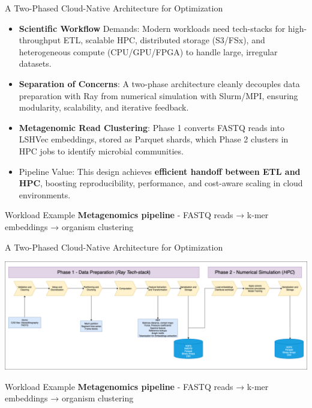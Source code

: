 \documentclass[aspectratio=169]{beamer}
\begin{document}
\begin{frame}{A Two-Phased Cloud-Native Architecture for Optimization}
    \begin{itemize}


\item \textbf{Scientific Workflow} Demands: Modern workloads need tech-stacks for high-throughput ETL, scalable HPC, distributed storage (S3/FSx), and heterogeneous compute (CPU/GPU/FPGA) to handle large, irregular datasets.

\item \textbf{Separation of Concerns}: A two-phase architecture cleanly decouples data preparation with Ray from numerical simulation with Slurm/MPI, ensuring modularity, scalability, and iterative feedback.

\item \textbf{Metagenomic Read Clustering}: Phase 1 converts FASTQ reads into LSHVec embeddings, stored as Parquet shards, which Phase 2 clusters in HPC jobs to identify microbial communities.

\item Pipeline Value: This design achieves \textbf{efficient handoff between ETL and HPC}, boosting reproducibility, performance, and cost-aware scaling in cloud environments.
        
    \end{itemize}
        
    \vspace{0.3cm}
    \begin{block}{Workload Example}
        \textbf{Metagenomics pipeline}  - FASTQ reads → k-mer embeddings → organism clustering
    \end{block}
\end{frame}


\begin{frame}{A Two-Phased Cloud-Native Architecture for Optimization}
        \vspace{0.4cm}
    
    \begin{center}
        \includegraphics[width=1\textwidth,height=0.6\textheight,keepaspectratio]{../../images/Generalized_data-pipeline.drawio.png}
    \end{center}
        
    \vspace{0.3cm}
    \begin{block}{Workload Example}
        \textbf{Metagenomics pipeline}  - FASTQ reads → k-mer embeddings → organism clustering
    \end{block}
\end{frame}
\end{document}
